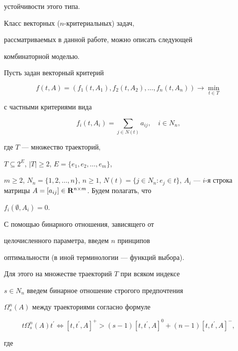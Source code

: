 устойчивости этого типа.








Класс векторных ($n$-критериальных) задач,


рассматриваемых в данной работе, можно описать следующей


комбинаторной моделью.


Пусть задан векторный критерий


$$


f(t,A)=(f_1(t,A_1),f_2(t,A_2),\dotsc,f_n(t,A_n)) \rightarrow


\min_{t \in T}


$$


с частными критериями вида


$$


f_i(t,A_i)=\sum_{j


\in N(t)}a_{ij},\quad i\in N_n,


$$


где $T$ --- множество траекторий,


$T\subseteq 2^E$, $|T| \geq 2$, $E=\{e_1,e_2,\dotsc,e_m\}$,


$m\geq 2$, $N_n=\{1,2,\dotsc,n\}$, $n\geq 1$, $N(t)=\{j\in N_n :


e_j\in t\}$, $A_i$ --- $i$-я строка матрицы $A=[a_{ij}]\in


\bold{R}^{n \times m}$. Будем полагать, что


$f_i(\emptyset,A_i)=0$.





С помощью бинарного отношения, зависящего от


целочисленного параметра, введем $n$ принципов


оптимальности (в иной терминологии --- функций выбора).


Для этого на множестве траекторий $T$ при всяком индексе


$s\in N_n$ введем бинарное отношение строгого предпочтения


$\Omega^n_s(A)$ между траекториями согласно формуле


$$


t \Omega^n_s(A) t^{\prime} \Leftrightarrow [t,t^{\prime},A]^+>


(s-1)[t,t^{\prime},A]^0+(n-1)[t,t^{\prime},A]^-,


$$


где


